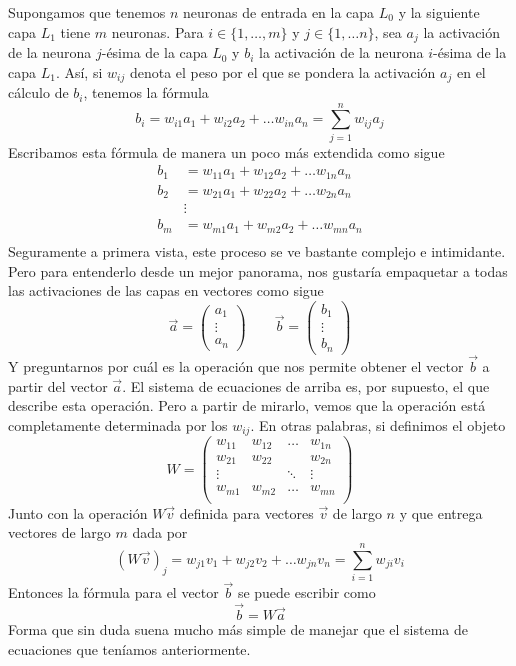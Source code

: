 Supongamos que tenemos $n$ neuronas de entrada en la capa $L_0$ y la siguiente capa $L_1$ tiene $m$ neuronas. Para $i \in \{1, \dots, m\}$ y $j \in \{1, \dots n\}$, sea $a_j$ la activación de la neurona $j$-ésima de la capa $L_0$ y $b_i$ la activación de la neurona $i$-ésima de la capa $L_1$. Así, si $w_{ij}$ denota el peso por el que se pondera la activación $a_j$ en el cálculo de $b_i$, tenemos la fórmula
\[b_i = w_{i1} a_1 + w_{i2} a_2 + \dots w_{in} a_n = \sum_{j=1}^n w_{ij} a_j\]
Escribamos esta fórmula de manera un poco más extendida como sigue
\begin{align*}
    b_1 &= w_{11} a_1 + w_{12} a_2 + \dots w_{1n} a_n \\
    b_2 &= w_{21} a_1 + w_{22} a_2 + \dots w_{2n} a_n \\
    &\vdots \\
    b_m &= w_{m1} a_1 + w_{m2} a_2 + \dots w_{mn} a_n \\
\end{align*}
Seguramente a primera vista, este proceso se ve bastante complejo e intimidante. Pero para entenderlo desde un mejor panorama, nos gustaría empaquetar a todas las activaciones de las capas en vectores como sigue
\[\vec{a} = \begin{pmatrix}
    a_1\\ \vdots \\ a_n
\end{pmatrix} \qquad \vec{b} = \begin{pmatrix}
    b_1\\ \vdots \\ b_n
\end{pmatrix}\]
Y preguntarnos por cuál es la operación que nos permite obtener el vector $\vec{b}$ a partir del vector $\vec{a}$. El sistema de ecuaciones de arriba es, por supuesto, el que describe esta operación. Pero a partir de mirarlo, vemos que la operación está completamente determinada por los $w_{ij}$. En otras palabras, si definimos el objeto
\[W = \begin{pmatrix}
    w_{11} & w_{12} & \dots & w_{1n} \\
    w_{21} & w_{22} &       & w_{2n} \\
    \vdots &        & \ddots& \vdots \\
    w_{m1} & w_{m2} & \dots & w_{mn} \\
\end{pmatrix}\]
Junto con la operación $W\vec{v}$ definida para vectores $\vec{v}$ de largo $n$ y que entrega vectores de largo $m$ dada por
\[(W\vec{v})_j = w_{j1} v_1 + w_{j2} v_2 + \dots w_{jn} v_n = \sum_{i = 1}^n w_{ji} v_i\]
Entonces la fórmula para el vector $\vec{b}$ se puede escribir como
\[\vec{b} = W \vec{a}\]
Forma que sin duda suena mucho más simple de manejar que el sistema de ecuaciones que teníamos anteriormente.

